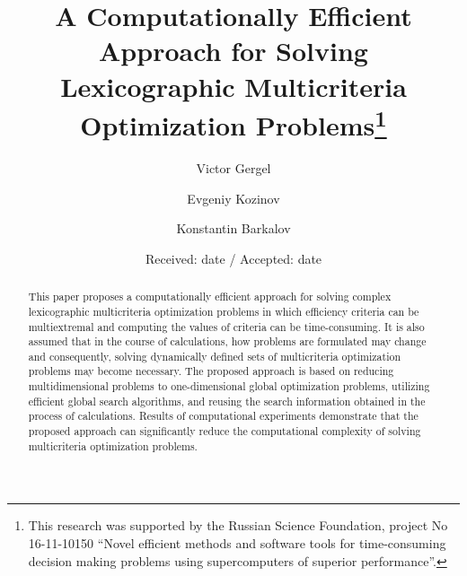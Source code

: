 \documentclass[smallextended]{svjour3}       %
\begin{document}
\title{A Computationally Efficient Approach for Solving Lexicographic Multicriteria Optimization Problems\thanks{This research was supported by the Russian Science Foundation, project No 16-11-10150 ``Novel efficient methods and software tools for time-consuming decision making problems using supercomputers of superior performance''.}
}


\author{Victor Gergel %
\and
Evgeniy Kozinov
\and
Konstantin Barkalov
}



\date{Received: date / Accepted: date}

\maketitle

\begin{abstract}
This paper proposes a computationally efficient approach for solving complex lexicographic multicriteria optimization problems in which efficiency criteria can be multiextremal and computing the values of criteria can be time-consuming. It is also assumed that in the course of calculations, how problems are formulated may change and consequently, solving dynamically defined sets of multicriteria optimization problems may become necessary. The proposed approach is based on reducing multidimensional problems to one-dimensional global optimization problems, utilizing efficient global search algorithms, and reusing the search information obtained in the process of calculations. Results of computational experiments demonstrate that the proposed approach can significantly reduce the computational complexity of solving multicriteria optimization problems.
\end{abstract}
\end{document}
